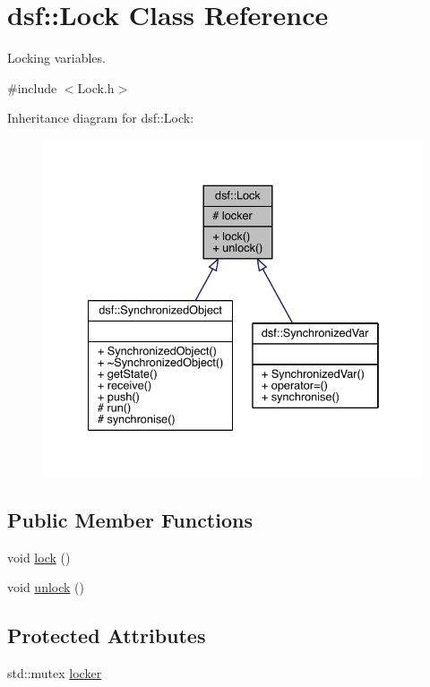 \hypertarget{classdsf_1_1_lock}{}\section{dsf\+:\+:Lock Class Reference}
\label{classdsf_1_1_lock}


Locking variables.  




{\ttfamily \#include $<$Lock.\+h$>$}



Inheritance diagram for dsf\+:\+:Lock\+:\nopagebreak
\begin{figure}[H]
\begin{center}
\leavevmode
\includegraphics[width=334pt]{classdsf_1_1_lock__inherit__graph}
\end{center}
\end{figure}
\subsection*{Public Member Functions}
\begin{DoxyCompactItemize}
\item 
void \hyperlink{classdsf_1_1_lock_ae521388d861fe66b9c6e2f09811b0d4b}{lock} ()
\item 
void \hyperlink{classdsf_1_1_lock_a3d03f801920d458b3c3c402a0f4af323}{unlock} ()
\end{DoxyCompactItemize}
\subsection*{Protected Attributes}
\begin{DoxyCompactItemize}
\item 
std\+::mutex \hyperlink{classdsf_1_1_lock_a605f27e33e37dc8b3b920a3272461c44}{locker}
\end{DoxyCompactItemize}


